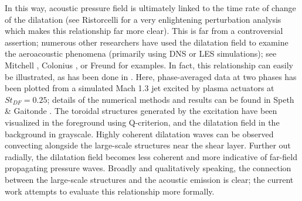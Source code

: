 In this way, acoustic pressure field is ultimately linked to the time rate of change of the dilatation (see Ristorcelli \citep{Ristorcelli1997} for a very enlightening perturbation analysis which makes this relationship far more clear).
This is far from a controversial assertion; numerous other researchers have used the dilatation field to examine the aeroacoustic phenomena (primarily using DNS or LES simulations); see Mitchell \etal \citep{Mitchell1995}, Colonius \etal \citep{Colonius1997}, or Freund \etal \citep{Freund2000} for examples.
In fact, this relationship can easily be illustrated, as has been done in . 
Here, phase-averaged data at two phases has been plotted from a simulated Mach 1.3 jet excited by plasma actuators at $St_{DF} = 0.25$; details of the numerical methods and results can be found in Speth \& Gaitonde \citep{Speth2014}. 
The toroidal structures generated by the excitation have been visualized in the foreground using Q-criterion, and the dilatation field in the background in grayscale.
Highly coherent dilatation waves can be observed convecting alongside the large-scale structures near the shear layer. 
Further out radially, the dilatation field becomes less coherent and more indicative of far-field propagating pressure waves.
Broadly and qualitatively speaking, the connection between the large-scale structures and the acoustic emission is clear; the current work attempts to evaluate this relationship more formally.
